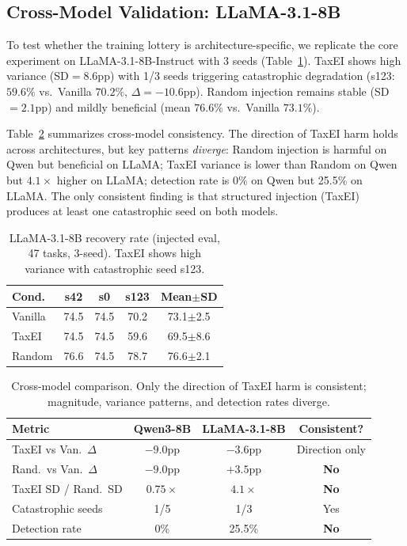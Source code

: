 \documentclass[11pt,a4paper]{article}
\begin{document}
\subsection{Cross-Model Validation: LLaMA-3.1-8B}
\label{sec:crossmodel}

To test whether the training lottery is architecture-specific, we replicate the core experiment on LLaMA-3.1-8B-Instruct with 3 seeds (Table~\ref{tab:llama}).
TaxEI shows high variance (SD${=}8.6$pp) with 1/3 seeds triggering catastrophic degradation (s123: $59.6\%$ vs.\ Vanilla $70.2\%$, $\Delta{=}-10.6$pp).
Random injection remains stable (SD${=}2.1$pp) and mildly beneficial (mean $76.6\%$ vs.\ Vanilla $73.1\%$).

Table~\ref{tab:crossmodel_summary} summarizes cross-model consistency.
The direction of TaxEI harm holds across architectures, but key patterns \emph{diverge}: Random injection is harmful on Qwen but beneficial on LLaMA; TaxEI variance is lower than Random on Qwen but $4.1\times$ higher on LLaMA; detection rate is 0\% on Qwen but 25.5\% on LLaMA.
The only consistent finding is that structured injection (TaxEI) produces at least one catastrophic seed on both models.

\begin{table}[t]
\centering
\small
\caption{LLaMA-3.1-8B recovery rate (injected eval, 47 tasks, 3-seed). TaxEI shows high variance with catastrophic seed s123.}
\label{tab:llama}
\begin{tabular}{lcccc}
\toprule
\textbf{Cond.} & \textbf{s42} & \textbf{s0} & \textbf{s123} & \textbf{Mean$\pm$SD} \\
\midrule
Vanilla & 74.5 & 74.5 & 70.2 & 73.1$\pm$2.5 \\
TaxEI & 74.5 & 74.5 & 59.6 & 69.5$\pm$8.6 \\
Random & 76.6 & 74.5 & 78.7 & 76.6$\pm$2.1 \\
\bottomrule
\end{tabular}
\end{table}

\begin{table}[t]
\centering
\small
\caption{Cross-model comparison. Only the direction of TaxEI harm is consistent; magnitude, variance patterns, and detection rates diverge.}
\label{tab:crossmodel_summary}
\begin{tabular}{lccc}
\toprule
\textbf{Metric} & \textbf{Qwen3-8B} & \textbf{LLaMA-3.1-8B} & \textbf{Consistent?} \\
\midrule
TaxEI vs Van.\ $\Delta$ & $-9.0$pp & $-3.6$pp & Direction only \\
Rand.\ vs Van.\ $\Delta$ & $-9.0$pp & $+3.5$pp & \textbf{No} \\
TaxEI SD / Rand.\ SD & $0.75\times$ & $4.1\times$ & \textbf{No} \\
Catastrophic seeds & 1/5 & 1/3 & Yes \\
Detection rate & 0\% & 25.5\% & \textbf{No} \\
\bottomrule
\end{tabular}
\end{table}
\end{document}
